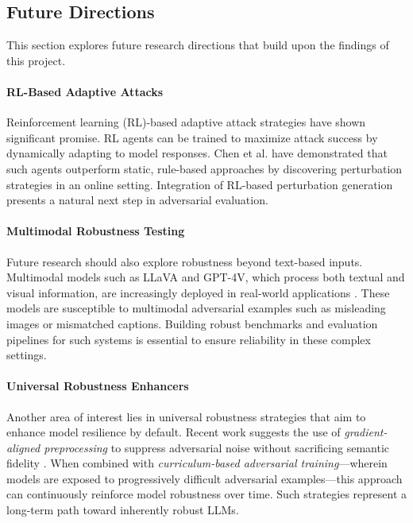 \documentclass[conference]{IEEEtran}
\begin{document}
\subsection{Future Directions}

This section explores future research directions that build upon the findings of this project.

\paragraph{RL-Based Adaptive Attacks}
Reinforcement learning (RL)-based adaptive attack strategies have shown significant promise. RL agents can be trained to maximize attack success by dynamically adapting to model responses. Chen et al. \cite{chen2025worstcase} have demonstrated that such agents outperform static, rule-based approaches by discovering perturbation strategies in an online setting. Integration of RL-based perturbation generation presents a natural next step in adversarial evaluation.

\paragraph{Multimodal Robustness Testing}
Future research should also explore robustness beyond text-based inputs. Multimodal models such as LLaVA and GPT-4V, which process both textual and visual information, are increasingly deployed in real-world applications \cite{wsj2025securityrisks}. These models are susceptible to multimodal adversarial examples such as misleading images or mismatched captions. Building robust benchmarks and evaluation pipelines for such systems is essential to ensure reliability in these complex settings\cite{wsj2025securityrisks}.

\paragraph{Universal Robustness Enhancers}
Another area of interest lies in universal robustness strategies that aim to enhance model resilience by default. Recent work suggests the use of \textit{gradient-aligned preprocessing} to suppress adversarial noise without sacrificing semantic fidelity \cite{omar2022robust}. When combined with \textit{curriculum-based adversarial training}—wherein models are exposed to progressively difficult adversarial examples—this approach can continuously reinforce model robustness over time. Such strategies represent a long-term path toward inherently robust LLMs.
\end{document}
